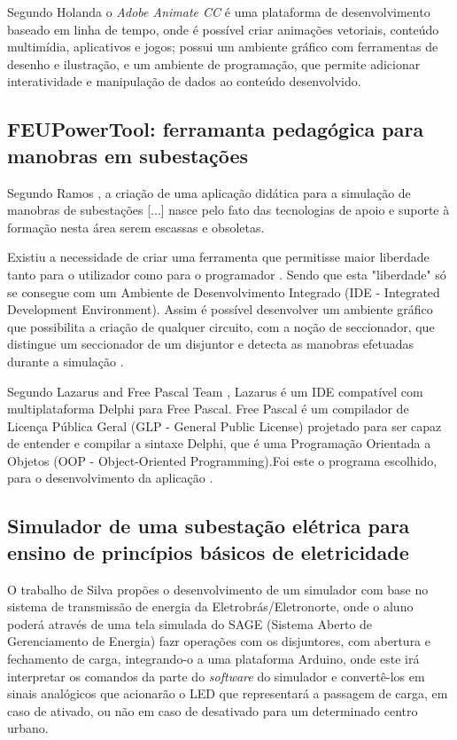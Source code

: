 Segundo Holanda \citeyearpar{holanda2016suel} o \textit{Adobe Animate CC} é uma plataforma de desenvolvimento baseado em linha de tempo, onde é possível criar animações vetoriais, conteúdo multimídia, aplicativos e jogos; possui um ambiente gráfico com ferramentas de desenho e ilustração, e um ambiente de programação, que permite adicionar interatividade e manipulação de dados ao conteúdo desenvolvido.


\subsection{FEUPowerTool: ferramanta pedagógica para manobras em subestações}

Segundo Ramos \citeyearpar{ramos2010feupowertool}, a criação de uma aplicação didática para a simulação de manobras de subestações [...] nasce pelo fato das tecnologias de apoio e suporte à formação nesta área serem escassas e obsoletas.

Existiu a necessidade de criar uma ferramenta que permitisse maior liberdade tanto para o utilizador como para o programador \cite{ramos2010feupowertool}. Sendo que esta "liberdade" só se consegue com um Ambiente de Desenvolvimento Integrado (IDE - Integrated Development Environment). Assim é possível desenvolver um ambiente gráfico que possibilita a criação de qualquer circuito, com a noção de seccionador, que distingue um seccionador de um disjuntor e detecta as manobras efetuadas durante a simulação \cite{ramos2010feupowertool}.

Segundo Lazarus and Free Pascal Team \cite{lazarus}, Lazarus é um IDE compatível com multiplataforma Delphi para Free Pascal. Free Pascal é um compilador de Licença Pública Geral (GLP - General Public License) projetado para ser capaz de entender e compilar a sintaxe Delphi, que é uma Programação Orientada a Objetos (OOP - Object-Oriented Programming).Foi este o programa escolhido, para o desenvolvimento da aplicação \cite{ramos2010feupowertool}.


\subsection{Simulador de uma subestação elétrica para ensino de princípios básicos de eletricidade}

O trabalho de Silva \citeyearpar{silva2017simulador} propões o desenvolvimento de um simulador com base no sistema de transmissão de energia da Eletrobrás/Eletronorte, onde o aluno poderá através de uma tela simulada do SAGE (Sistema Aberto de Gerenciamento de Energia) fazr operações com os disjuntores, com abertura e fechamento de carga, integrando-o a uma plataforma Arduino, onde este irá interpretar os comandos da parte do \textit{software} do simulador e convertê-los em sinais analógicos que acionarão o LED que representará a passagem de carga, em caso de ativado, ou não em caso de desativado para um determinado centro urbano.

